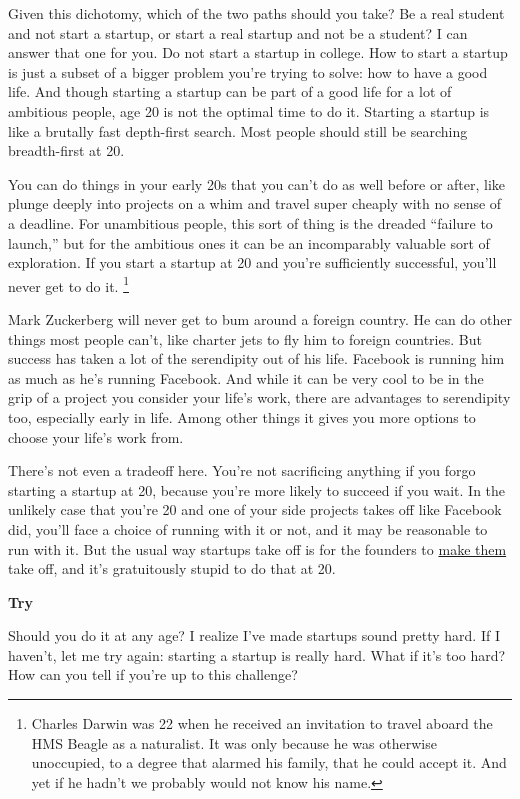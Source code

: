 \documentclass[12pt]{book}
\begin{document}
Given this dichotomy, which of the two paths should you take? Be a real
student and not start a startup, or start a real startup and not be a
student? I can answer that one for you. Do not start a startup in
college. How to start a startup is just a subset of a bigger problem
you're trying to solve: how to have a good life. And though starting a
startup can be part of a good life for a lot of ambitious people, age 20
is not the optimal time to do it. Starting a startup is like a brutally
fast depth-first search. Most people should still be searching
breadth-first at 20.

You can do things in your early 20s that you can't do as well before or
after, like plunge deeply into projects on a whim and travel super
cheaply with no sense of a deadline. For unambitious people, this sort
of thing is the dreaded ``failure to launch,'' but for the ambitious
ones it can be an incomparably valuable sort of exploration. If you
start a startup at 20 and you're sufficiently successful, you'll never
get to do it. \footnote{Charles Darwin was 22 when he received an invitation to travel
aboard the HMS Beagle as a naturalist. It was only because he was
otherwise unoccupied, to a degree that alarmed his family, that he could
accept it. And yet if he hadn't we probably would not know his name.}

Mark Zuckerberg will never get to bum around a foreign country. He can
do other things most people can't, like charter jets to fly him to
foreign countries. But success has taken a lot of the serendipity out of
his life. Facebook is running him as much as he's running Facebook. And
while it can be very cool to be in the grip of a project you consider
your life's work, there are advantages to serendipity too, especially
early in life. Among other things it gives you more options to choose
your life's work from.

There's not even a tradeoff here. You're not sacrificing anything if you
forgo starting a startup at 20, because you're more likely to succeed if
you wait. In the unlikely case that you're 20 and one of your side
projects takes off like Facebook did, you'll face a choice of running
with it or not, and it may be reasonable to run with it. But the usual
way startups take off is for the founders to \href{ds.html}{make them}
take off, and it's gratuitously stupid to do that at 20.

\textbf{Try}

Should you do it at any age? I realize I've made startups sound pretty
hard. If I haven't, let me try again: starting a startup is really hard.
What if it's too hard? How can you tell if you're up to this challenge?
\end{document}
